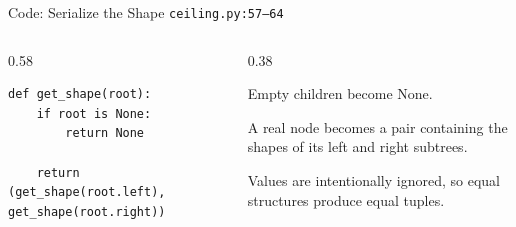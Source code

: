 \documentclass[aspectratio=169,11pt]{beamer}
\begin{document}
\begin{frame}[fragile]{Code: Serialize the Shape}
\scriptsize
{} \texttt{ceiling.py:57--64}

\vspace{0.08cm}
\begin{columns}[T,totalwidth=\textwidth]
\begin{column}{0.58\textwidth}
\begin{lstlisting}[style=cpcode]
def get_shape(root):
    if root is None:
        return None

    return (get_shape(root.left), get_shape(root.right))
\end{lstlisting}
\end{column}
\begin{column}{0.38\textwidth}
\begin{tightitemize}
  \item Empty children become None.
  \item A real node becomes a pair containing the shapes of its left and right subtrees.
  \item Values are intentionally ignored, so equal structures produce equal tuples.
\end{tightitemize}
\end{column}
\end{columns}
\end{frame}
\end{document}
